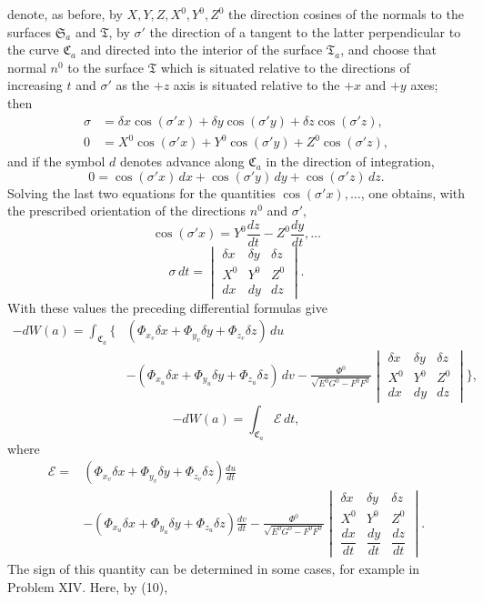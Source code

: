 \documentclass[11pt,a4paper,leqno]{article}
\begin{document}
denote, as before, by $X,Y,Z,X^0,Y^0,Z^0$ the direction cosines of the
normals to the surfaces $\mathfrak{S}_a$ and $\mathfrak{T}$, by $\sigma'$ the
direction of a tangent to the latter perpendicular to the curve
$\mathfrak{C}_a$ and directed into the interior of the surface
$\mathfrak{T}_a$, and choose that normal $n^0$ to the surface
$\mathfrak{T}$ which is situated relative to the directions of increasing
$t$ and $\sigma'$ as the $+z$ axis is situated relative to the $+x$ and $+y$
axes; then
\[
\begin{aligned}
\sigma&=\delta x\cos(\sigma'x)+\delta y\cos(\sigma'y)
        +\delta z\cos(\sigma'z),\\
0&=X^0\cos(\sigma'x)+Y^0\cos(\sigma'y)+Z^0\cos(\sigma'z),
\end{aligned}
\]
and if the symbol $d$ denotes advance along $\mathfrak{C}_a$ in the direction
of integration,
\[
0=\cos(\sigma'x)\,dx+\cos(\sigma'y)\,dy+\cos(\sigma'z)\,dz.
\]
Solving the last two equations for the quantities
$\cos(\sigma'x),\ldots$, one obtains, with the prescribed orientation of the
directions $n^0$ and $\sigma'$,
\[
\cos(\sigma'x)=Y^0\frac{dz}{dt}-Z^0\frac{dy}{dt},\ldots
\]
\begin{equation}\tag{48}
\sigma\,dt=
\begin{vmatrix}
\delta x&\delta y&\delta z\\
X^0&Y^0&Z^0\\
dx&dy&dz
\end{vmatrix}.
\end{equation}
With these values the preceding differential formulas give
\[
\begin{aligned}
-dW(a)=\int_{\mathfrak{C}_a}\Bigg\{&
(\Phi_{x_v}\delta x+\Phi_{y_v}\delta y+\Phi_{z_v}\delta z)\,du\\
&-(\Phi_{x_u}\delta x+\Phi_{y_u}\delta y+\Phi_{z_u}\delta z)\,dv
-\frac{\Phi^0}{\sqrt{E^0G^0-F^0F^0}}
\begin{vmatrix}
\delta x&\delta y&\delta z\\
X^0&Y^0&Z^0\\
dx&dy&dz
\end{vmatrix}\Bigg\},
\end{aligned}
\]
\[
-dW(a)=\int_{\mathfrak{C}_a}\mathcal{E}\,dt,
\]
where
\begin{equation}\tag{49}
\begin{aligned}
\mathcal{E}={}&
(\Phi_{x_v}\delta x+\Phi_{y_v}\delta y+\Phi_{z_v}\delta z)\frac{du}{dt}\\
&-(\Phi_{x_u}\delta x+\Phi_{y_u}\delta y+\Phi_{z_u}\delta z)\frac{dv}{dt}
-\frac{\Phi^0}{\sqrt{E^0G^0-F^0F^0}}
\begin{vmatrix}
\delta x&\delta y&\delta z\\
X^0&Y^0&Z^0\\
\dfrac{dx}{dt}&\dfrac{dy}{dt}&\dfrac{dz}{dt}
\end{vmatrix}.
\end{aligned}
\end{equation}
The sign of this quantity can be determined in some cases, for example in
Problem XIV. Here, by (10),
\end{document}
